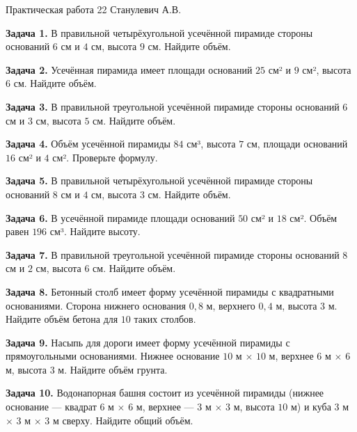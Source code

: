 \documentclass{umk-matematika}
\begin{document}
\maketitlepage
    {Практическая работа 22}
    {}
    {Станулевич А.В.}

\textbf{Задача 1.} В правильной четырёхугольной усечённой пирамиде стороны оснований $6$ см и $4$ см, высота $9$ см. Найдите объём.\par\vspace{10pt}
\textbf{Задача 2.} Усечённая пирамида имеет площади оснований $25$ см² и $9$ см², высота $6$ см. Найдите объём.\par\vspace{10pt}
\textbf{Задача 3.} В правильной треугольной усечённой пирамиде стороны оснований $6$ см и $3$ см, высота $5$ см. Найдите объём.\par\vspace{10pt}
\textbf{Задача 4.} Объём усечённой пирамиды $84$ см³, высота $7$ см, площади оснований $16$ см² и $4$ см². Проверьте формулу.\par\vspace{10pt}
\textbf{Задача 5.} В правильной четырёхугольной усечённой пирамиде стороны оснований $8$ см и $4$ см, высота $3$ см. Найдите объём.\par\vspace{10pt}
\textbf{Задача 6.} В усечённой пирамиде площади оснований $50$ см² и $18$ см². Объём равен $196$ см³. Найдите высоту.\par\vspace{10pt}
\textbf{Задача 7.} В правильной треугольной усечённой пирамиде стороны оснований $8$ см и $2$ см, высота $6$ см. Найдите объём.\par\vspace{10pt}
\textbf{Задача 8.} Бетонный столб имеет форму усечённой пирамиды с квадратными основаниями. Сторона нижнего основания $0{,}8$ м, верхнего $0{,}4$ м, высота $3$ м. Найдите объём бетона для $10$ таких столбов.\par\vspace{10pt}
\textbf{Задача 9.} Насыпь для дороги имеет форму усечённой пирамиды с прямоугольными основаниями. Нижнее основание $10$ м $\times$ $10$ м, верхнее $6$ м $\times$ $6$ м, высота $3$ м. Найдите объём грунта.\par\vspace{10pt}
\textbf{Задача 10.} Водонапорная башня состоит из усечённой пирамиды (нижнее основание — квадрат $6$ м $\times$ $6$ м, верхнее — $3$ м $\times$ $3$ м, высота $10$ м) и куба $3$ м $\times$ $3$ м $\times$ $3$ м сверху. Найдите общий объём.\par\vspace{10pt}
\newpage
\end{document}
